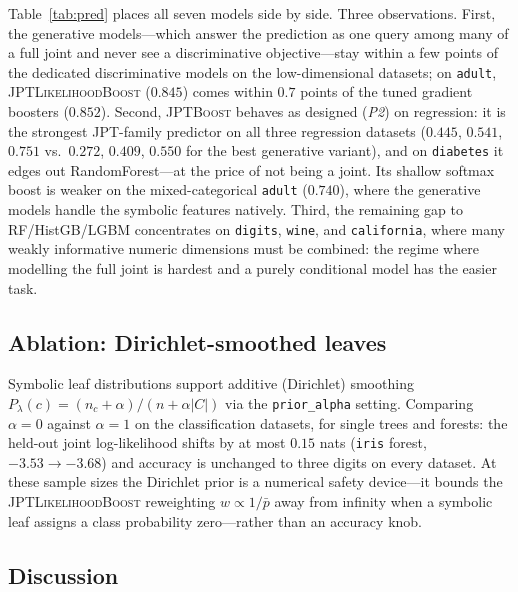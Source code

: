 \documentclass[11pt]{article}
\theoremstyle{plain}
\theoremstyle{definition}
\theoremstyle{remark}
\newcommand{\likeboost}{\textsc{JPTLikelihoodBoost}}
\newcommand{\jptboost}{\textsc{JPTBoost}}
\begin{document}
Table~\ref{tab:pred} places all seven models side by side. Three
observations. First, the generative models---which answer the
prediction as one query among many of a full joint and never see a
discriminative objective---stay within a few points of the dedicated
discriminative models on the low-dimensional datasets; on
\texttt{adult}, \likeboost{} ($0.845$) comes within $0.7$ points of
the tuned gradient boosters ($0.852$). Second, \jptboost{} behaves as
designed (\emph{P2}) on regression: it is the strongest JPT-family
predictor on all three regression datasets ($0.445$, $0.541$, $0.751$
vs.\ $0.272$, $0.409$, $0.550$ for the best generative variant), and
on \texttt{diabetes} it edges out RandomForest---at the price of not
being a joint. Its shallow softmax boost is weaker on the
mixed-categorical \texttt{adult} ($0.740$), where the generative
models handle the symbolic features natively. Third, the remaining
gap to RF/HistGB/LGBM concentrates on \texttt{digits}, \texttt{wine},
and \texttt{california}, where many weakly informative numeric
dimensions must be combined: the regime where modelling the full
joint is hardest and a purely conditional model has the easier task.

\subsection{Ablation: Dirichlet-smoothed leaves}
\label{sec:exp-alpha}

Symbolic leaf distributions support additive (Dirichlet) smoothing
$P_\lambda(c)=(n_c+\alpha)/(n+\alpha|C|)$ via the \texttt{prior\_alpha}
setting. Comparing $\alpha{=}0$ against $\alpha{=}1$ on the
classification datasets, for single trees and forests: the held-out
joint log-likelihood shifts by at most $0.15$ nats (\texttt{iris}
forest, $-3.53\to-3.68$) and accuracy is unchanged to three digits on
every dataset. At these sample sizes the Dirichlet prior is a numerical
safety device---it bounds the \likeboost{} reweighting
$w\propto1/\bar p$ away from infinity when a symbolic leaf assigns a
class probability zero---rather than an accuracy knob.

\subsection{Discussion}
\end{document}
